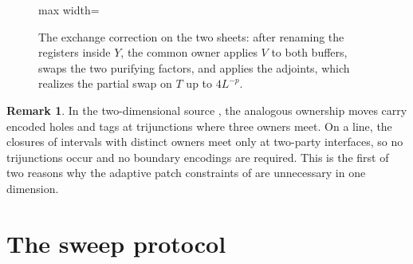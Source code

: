 \documentclass[aps,prx,reprint,superscriptaddress,floatfix,nofootinbib,longbibliography,amsmath,amssymb]{revtex4-2}
\theoremstyle{plain}
\theoremstyle{definition}
\newtheorem{remark}[theorem]{Remark}
\begin{document}
\begin{figure}[t]
\centering
\begin{adjustbox}{max width=\linewidth}

\end{adjustbox}
\caption{The exchange correction on the two sheets: after renaming the registers inside $Y$, the common owner applies $V$ to both buffers, swaps the two purifying factors, and applies the adjoints, which realizes the partial swap on $T$ up to $4L^{-p}$.}\label{fig:qc-exchange}
\end{figure}

\begin{remark}
In the two-dimensional source \cite{PP}, the analogous ownership moves carry
encoded holes and tags at trijunctions where three owners meet. On a line, the
closures of intervals with distinct owners meet only at two-party interfaces, so
no trijunctions occur and no boundary encodings are required. This is the first of
two reasons why the adaptive patch constraints of \cite[Section~4]{PP} are
unnecessary in one dimension.
\end{remark}

\section{The sweep protocol}\label{sec:sweep}
\end{document}
